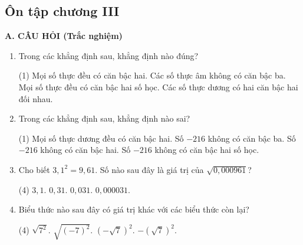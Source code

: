 \begin{practice}
    \subsection{Ôn tập chương III}

    \textbf{A. CÂU HỎI (Trắc nghiệm)}

    \begin{enumerate}
        \item Trong các khẳng định sau, khẳng định nào đúng?
        \begin{tasks}(1)
            \task[(A)] Mọi số thực đều có căn bậc hai.
            \task[(B)] Các số thực âm không có căn bậc ba.
            \task[(C)] Mọi số thực đều có căn bậc hai số học.
            \task[(D)] Các số thực dương có hai căn bậc hai đối nhau.
        \end{tasks}
        \par\noindent\answerbox\par

        \item Trong các khẳng định sau, khẳng định nào sai?
        \begin{tasks}(1)
            \task[(A)] Mọi số thực dương đều có căn bậc hai.
            \task[(B)] Số $-216$ không có căn bậc ba.
            \task[(C)] Số $-216$ không có căn bậc hai.
            \task[(D)] Số $-216$ không có căn bậc hai số học.
        \end{tasks}
        \par\noindent\answerbox\par

        \item Cho biết $3{,}1^2=9{,}61$. Số nào sau đây là giá trị của $\sqrt{0{,}000961}$?
        \begin{tasks}(4)
            \task[(A)] $3{,}1$.
            \task[(B)] $0{,}31$.
            \task[(C)] $0{,}031$.
            \task[(D)] $0{,}000031$.
        \end{tasks}
        \par\noindent\answerbox\par

        \item Biểu thức nào sau đây có giá trị khác với các biểu thức còn lại?
        \begin{tasks}(4)
            \task[(A)] $\sqrt{7^2}$.
            \task[(B)] $\sqrt{(-7)^2}$.
            \task[(C)] $(-\sqrt{7})^2$.
            \task[(D)] $-(\sqrt{7})^2$.
        \end{tasks}
        \par\noindent\answerbox\par


\end{enumerate}
\end{practice}
